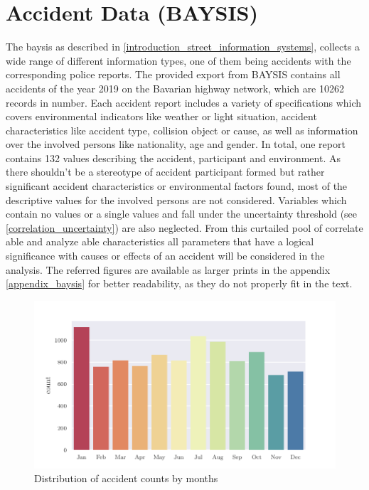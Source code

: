 \section{Accident Data (BAYSIS)}
\label{dataset_baysis}
The \acrfull{baysis} as described in \cref{introduction_street_information_systems}, collects a wide range of different information types, one of them being accidents with the corresponding police reports. The provided export from BAYSIS contains all accidents of the year 2019 on the Bavarian highway network, which are 10262 records in number. Each accident report includes a variety of specifications which covers environmental indicators like weather or light situation, accident characteristics like accident type, collision object or cause, as well as information over the involved persons like nationality, age and gender. In total, one report contains 132 values describing the accident, participant and environment. As there shouldn't be a stereotype of accident participant formed but rather significant accident characteristics or environmental factors found, most of the descriptive values for the involved persons are not considered. Variables which contain no values or a single values and fall under the uncertainty threshold (see \cref{correlation_uncertainty}) are also neglected. From this curtailed pool of correlate able and analyze able characteristics all parameters that have a logical significance with causes or effects of an accident will be considered in the analysis. The referred figures are available as larger prints in the appendix \cref{appendix_baysis} for better readability, as they do not properly fit in the text. 

\begin{figure}[ht]
	\centering
	\includegraphics[scale=0.9]{CorrAnalysis/data/BAYSIS/01_dataset/plots/baysis_dataset_hist_month}
	\caption{Distribution of accident counts by months}
	\label{img:baysis_dataset_dist_month}
\end{figure}

